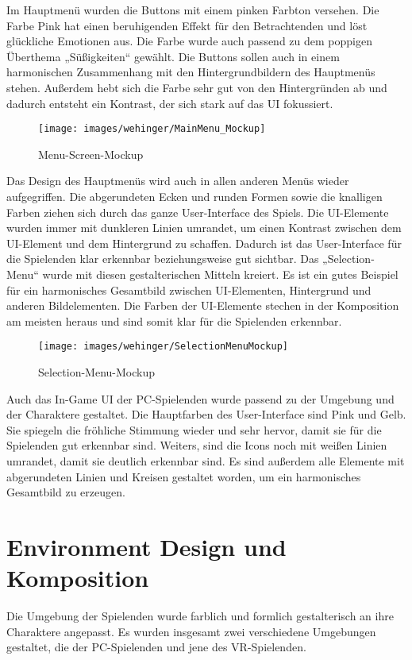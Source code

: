 Im Hauptmenü wurden die Buttons mit einem pinken Farbton versehen. Die Farbe Pink hat einen beruhigenden Effekt für den Betrachtenden und löst glückliche Emotionen aus. Die Farbe wurde auch passend zu dem poppigen Überthema „Süßigkeiten“ gewählt. Die Buttons sollen auch in einem harmonischen Zusammenhang mit den Hintergrundbildern des Hauptmenüs stehen. Außerdem hebt sich die Farbe sehr gut von den Hintergründen ab und dadurch entsteht ein Kontrast, der sich stark auf das UI fokussiert. 

\begin{figure}[H]
	\centering
	\texttt{[image: images/wehinger/MainMenu\_Mockup]}
	\caption{Menu-Screen-Mockup}
\end{figure}

Das Design des Hauptmenüs wird auch in allen anderen Menüs wieder aufgegriffen. Die abgerundeten Ecken und runden Formen sowie die knalligen Farben ziehen sich durch das ganze User-Interface des Spiels. Die UI-Elemente wurden immer mit dunkleren Linien umrandet, um einen Kontrast zwischen dem UI-Element und dem Hintergrund zu schaffen. Dadurch ist das User-Interface für die Spielenden klar erkennbar beziehungsweise gut sichtbar. Das „Selection-Menu“ wurde mit diesen gestalterischen Mitteln kreiert. Es ist ein gutes Beispiel für ein harmonisches Gesamtbild zwischen UI-Elementen, Hintergrund und anderen Bildelementen. Die Farben der UI-Elemente stechen in der Komposition am meisten heraus und sind somit klar für die Spielenden erkennbar.

\begin{figure}[H]
	\centering
	\texttt{[image: images/wehinger/SelectionMenuMockup]}
	\caption{Selection-Menu-Mockup}
\end{figure}

Auch das In-Game UI der PC-Spielenden wurde passend zu der Umgebung und der Charaktere gestaltet. Die Hauptfarben des User-Interface sind Pink und Gelb. Sie spiegeln die fröhliche Stimmung wieder und sehr hervor, damit sie für die Spielenden gut erkennbar sind. Weiters, sind die Icons noch mit weißen Linien umrandet, damit sie deutlich erkennbar sind. Es sind außerdem alle Elemente mit abgerundeten Linien und Kreisen gestaltet worden, um ein harmonisches Gesamtbild zu erzeugen.

\section{Environment Design und Komposition}
Die Umgebung der Spielenden wurde farblich und formlich gestalterisch an ihre Charaktere angepasst. Es wurden insgesamt zwei verschiedene Umgebungen gestaltet, die der PC-Spielenden und jene des VR-Spielenden. 

